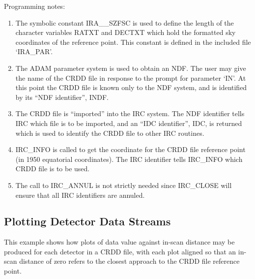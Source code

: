 Programming notes:

\begin{enumerate}

\item The symbolic constant IRA\_\_SZFSC is used to define the length of the
character variables RATXT and DECTXT which hold the formatted sky coordinates of
the reference point. This constant is defined in the included file `IRA\_PAR'. 

\item The ADAM parameter system is used to obtain an NDF. The user may give the 
name of the CRDD file in response to the prompt for parameter `IN'. At this
point the CRDD file is known only to the NDF system, and is identified by its
``NDF identifier'', INDF.

\item The CRDD file is ``imported'' into the IRC system. The NDF identifier
tells IRC which file is to be imported, and an ``IDC identifier'', IDC, is
returned which is used to identify the CRDD file to other IRC routines.

\item IRC\_INFO is called to get the coordinate for the CRDD file reference
point (in 1950 equatorial coordinates). The IRC identifier tells IRC\_INFO which
CRDD file is to be used. 

\item The call to IRC\_ANNUL is not strictly needed since IRC\_CLOSE will
ensure that all IRC identifiers are annuled.

\end{enumerate}

\subsection {Plotting Detector Data Streams}
This example shows how plots of data value against in-scan distance may
be produced for each detector in a CRDD file, with each plot aligned so that 
an in-scan distance of zero refers to the closest approach to the CRDD file
reference point. 

